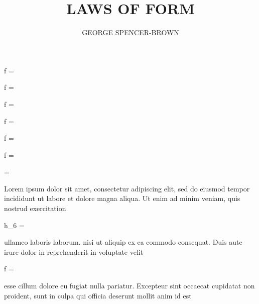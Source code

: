 \documentclass[11pt, a4paper]{book}
\title{LAWS OF FORM}
\author{GEORGE SPENCER-BROWN}
\begin{document}
\maketitle

\begin{form}
	f = 
\end{form}

\begin{form}
	f =  
\end{form}

\begin{form}
	f =   
\end{form}
	
\begin{form}
f = 
\end{form}
	
\begin{form}
	f = 
\end{form}
	
\begin{form}
f = 
\end{form}

\begin{form}
\end{form}

\begin{form}
\end{form}

\begin{form}
\end{form}

\begin{form}
	 = 
\end{form}

Lorem ipsum dolor sit amet, consectetur adipiscing elit, sed do eiusmod tempor incididunt ut labore et dolore magna 
aliqua. Ut enim ad minim veniam, quis nostrud exercitation \begin{forminline}
	h_6 = 
\end{forminline} ullamco laboris laborum. nisi ut aliquip ex ea commodo consequat. Duis aute irure dolor in 
reprehenderit in voluptate velit \begin{forminline}
	f = 
\end{forminline} esse cillum dolore eu fugiat nulla pariatur. Excepteur sint occaecat cupidatat non 
proident, sunt in culpa qui officia deserunt mollit anim id est
\end{document}
